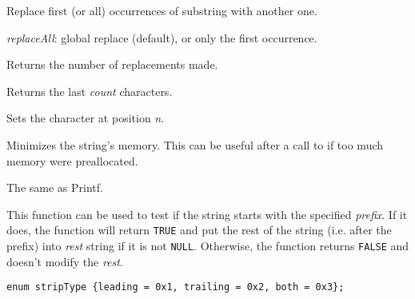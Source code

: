 
Replace first (or all) occurrences of substring with another one.

{\it replaceAll}: global replace (default), or only the first occurrence.

Returns the number of replacements made.

\label{wxstringright}


Returns the last {\it count} characters.

\label{wxstringsetchar}


Sets the character at position {\it n}.

\label{wxstringshrink}


Minimizes the string's memory. This can be useful after a call to 
 if too much memory were preallocated.

\label{wxstringsprintf}


The same as Printf.

\label{wxstringstartswith}


This function can be used to test if the string starts with the specified 
{\it prefix}. If it does, the function will return {\tt TRUE} and put the rest
of the string (i.e. after the prefix) into {\it rest} string if it is not 
{\tt NULL}. Otherwise, the function returns {\tt FALSE} and doesn't modify the 
{\it rest}.

\label{wxstringstrip}

\begin{verbatim}
enum stripType {leading = 0x1, trailing = 0x2, both = 0x3};
\end{verbatim}



